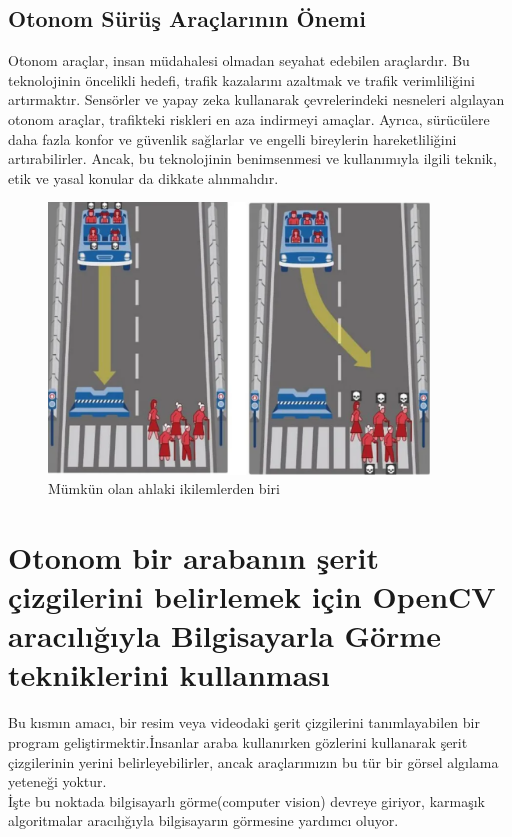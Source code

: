 \documentclass{article}
\begin{document}
\subsection{Otonom Sürüş Araçlarının Önemi}
Otonom araçlar, insan müdahalesi olmadan seyahat edebilen araçlardır. Bu teknolojinin öncelikli hedefi, trafik kazalarını azaltmak ve trafik verimliliğini artırmaktır. Sensörler ve yapay zeka kullanarak çevrelerindeki nesneleri algılayan otonom araçlar, trafikteki riskleri en aza indirmeyi amaçlar. Ayrıca, sürücülere daha fazla konfor ve güvenlik sağlarlar ve engelli bireylerin hareketliliğini artırabilirler. Ancak, bu teknolojinin benimsenmesi ve kullanımıyla ilgili teknik, etik ve yasal konular da dikkate alınmalıdır.\\[3pt]
\begin{figure}[h]
  \centering
  \includegraphics[width=0.9\textwidth]{image/Resim53.PNG} %
  \caption{Mümkün olan ahlaki ikilemlerden biri \cite{Dilemma}}
  \label{fig:python16}  
\end{figure}
\newpage
\section{Otonom bir arabanın şerit çizgilerini belirlemek için OpenCV aracılığıyla Bilgisayarla Görme tekniklerini kullanması}
Bu kısmın amacı, bir resim veya videodaki şerit çizgilerini tanımlayabilen bir program geliştirmektir.İnsanlar araba kullanırken gözlerini kullanarak şerit çizgilerinin yerini belirleyebilirler, ancak araçlarımızın bu tür bir görsel algılama yeteneği yoktur. \\[5pt]
İşte bu noktada bilgisayarlı görme(computer vision) devreye giriyor, karmaşık algoritmalar aracılığıyla bilgisayarın görmesine yardımcı oluyor.
\end{document}
